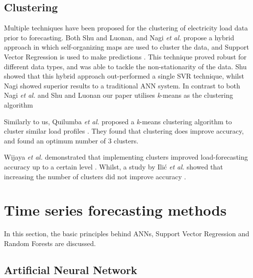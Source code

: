 \subsection{Clustering}

Multiple techniques have been proposed for the clustering of electricity load data prior to forecasting. Both Shu and Luonan, and Nagi \textit{et al.} propose a hybrid approach in which self-organizing maps are used to cluster the data, and Support Vector Regression is used to make predictions \cite{Shu2006,Tiong2008}. This technique proved robust for different data types, and was able to tackle the non-stationarity of the data. Shu showed that this hybrid approach out-performed a single SVR technique, whilst Nagi showed superior results to a traditional ANN system. In contrast to both Nagi \textit{et al.} and Shu and Luonan our paper utilises \textit{k}-means as the clustering algorithm 

Similarly to us, Quilumba \textit{et al.} proposed a \textit{k}-means clustering algorithm to cluster similar load profiles \cite{Quilumba2014}. They found that clustering does improve accuracy, and found an optimum number of 3 clusters.

Wijaya \textit{et al.} demonstrated that implementing clusters improved load-forecasting accuracy up to a certain level \cite{Wijaya2010}. Whilst, a study by Ili\'c \textit{et al.} showed that increasing the number of clusters did not improve accuracy \cite{Ilic2013}.


\section{Time series forecasting methods}

In this section, the basic principles behind ANNs, Support Vector Regression and Random Forests are discussed.

\subsection{Artificial Neural Network}


